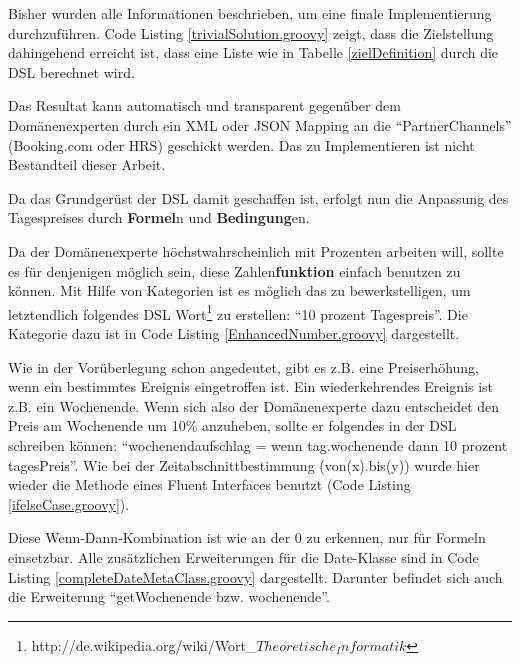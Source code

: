 \documentclass[11pt,english,ngerman, headsepline]{scrreprt}
\begin{document}
Bisher wurden alle Informationen beschrieben, um eine finale Implementierung
durchzuführen. Code Listing \ref{trivialSolution.groovy} zeigt, dass die
Zielstellung dahingehend erreicht ist, dass eine Liste wie in Tabelle
\ref{zielDefinition} durch die DSL berechnet wird.
 


Das Resultat kann automatisch und transparent gegenüber dem Domänenexperten
durch ein XML oder JSON Mapping an die ``PartnerChannels'' (Booking.com oder HRS) geschickt werden.
Das zu Implementieren ist nicht Bestandteil dieser Arbeit.

Da das Grundgerüst der DSL damit geschaffen ist, erfolgt nun die Anpassung des
Tagespreises durch {\bf Formel}n und {\bf Bedingung}en.

Da der Domänenexperte höchstwahrscheinlich mit Prozenten arbeiten will, sollte
es für denjenigen möglich sein, diese Zahlen{\bf funktion} einfach benutzen zu
können. Mit Hilfe von Kategorien ist es möglich das zu bewerkstelligen, um
letztendlich folgendes DSL
Wort\footnote{http://de.wikipedia.org/wiki/Wort\_\(Theoretische_Informatik\)}
zu erstellen: ``10 prozent Tagespreis''. Die Kategorie dazu ist in Code Listing
\ref{EnhancedNumber.groovy} dargestellt.
 


Wie in der Vorüberlegung schon angedeutet, gibt es z.B. eine Preiserhöhung, wenn
ein bestimmtes Ereignis eingetroffen ist. Ein wiederkehrendes
Ereignis ist z.B. ein Wochenende. Wenn sich also der Domänenexperte dazu
entscheidet den Preis am Wochenende um 10\% anzuheben, sollte er folgendes in der
DSL schreiben können: ``wochenendaufschlag = wenn tag.wochenende dann 10 prozent
tagesPreis''. Wie
bei der Zeitabschnittbestimmung (von(x).bis(y)) wurde hier wieder die Methode
eines Fluent Interfaces benutzt (Code Listing
\ref{ifelseCase.groovy}).
 


Diese Wenn-Dann-Kombination ist wie an der 0 zu erkennen, nur für Formeln
einsetzbar. 
Alle zusätzlichen Erweiterungen für die Date-Klasse sind in Code Listing
\ref{completeDateMetaClass.groovy} dargestellt. Darunter befindet sich auch die
Erweiterung ``getWochenende bzw. wochenende''.
\end{document}
